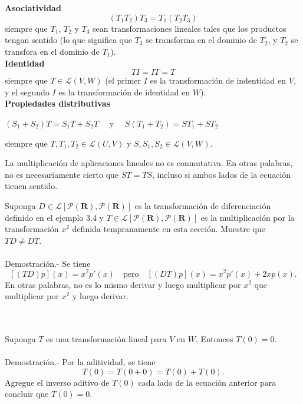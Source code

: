 \begin{myteo}\,\\\\
    \textbf{Asociatividad}
    $$(T_1T_2)T_3 = T_1(T_2T_3)$$
    siempre que $T_1$, $T_2$ y $T_3$ sean transformaciones lineales tales que los productos tengan sentido (lo que significa que $T_3$ se transforma en el dominio de $T_2$, y $T_2$ se transfora en el dominio de $T_1$).\\

    \textbf{Identidad}
    $$TI=IT=T$$
    siempre que $T\in \mathcal{L}(V,W)$ (el primer $I$ es la transformación de indentidad en $V$, y el segundo $I$ es la transformación de identidad en $W$).\\

    \textbf{Propiedades distributivas}
    \begin{center}
	$(S_1+S_2)T=S_1T+S_2T\quad$ y $\quad S(T_1+T_2)=ST_1+ST_2$
    \end{center}
    siempre que $T,T_1,T_2\in \mathcal{L}(U,V)$ y $S,S_1,S_2\in \mathcal{L}(V,W)$.
\end{myteo}

La multiplicación de aplicaciones lineales no es conmutativa. En otras palabras, no es necesariamente cierto que $ST=TS$, incluso si ambos lados de la ecuación tienen sentido.

\begin{myejem}
    Suponga $D\in \mathcal{L}\left[\mathcal{P}(\textbf{R}),\mathcal{P}(\textbf{R})\right]$ es la transformación de diferenciación definido en el ejemplo 3.4 y $T\in \mathcal{L}\left[\mathcal{P}(\textbf{R}),\mathcal{P}(\textbf{R})\right]$ es la multiplicación por la transformación $x^2$ definida tempranamente en esta sección. Muestre que $TD\neq DT$.\\\\
	Demostración.-\;  Se tiene 
	$$\left[(TD)p\right](x)=x^2p'(x) \quad \mbox{pero}\quad \left[(DT)p\right](x)=x^2p'(x)+2xp(x).$$
	En otras palabras, no es lo mismo derivar y luego multiplicar por  $x^2$ que multiplicar por $x^2$ y luego derivar.
\end{myejem}

\begin{myteo}\,\\\\
    Suponga $T$ es una transformación lineal para $V$ en $W$. Entonces $T(0)=0$.\\\\
	Demostración.-\; Por la aditividad, se tiene
	$$T(0)=T(0+0)=T(0)+T(0).$$
	Agregue el inverso aditivo de $T(0)$ cada lado de la ecuación anterior para concluir que $T(0)=0$.
\end{myteo}


